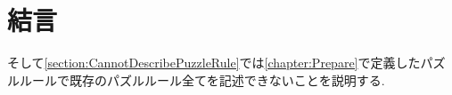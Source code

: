 \chapter{結言}
そして\cref{section:CannotDescribePuzzleRule}では\cref{chapter:Prepare}で定義したパズルルールで既存のパズルルール全てを記述できないことを説明する.